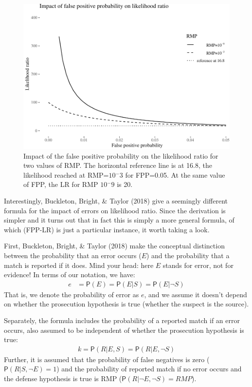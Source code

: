\documentclass[
  10pt,
  dvipsnames,enabledeprecatedfontcommands]{scrartcl}
\newcommand{\n}{\neg}
\newcommand{\pr}[1]{\mathsf{P}(#1)}
\begin{document}
\begin{figure}

\begin{center}\includegraphics[width=1\linewidth]{lr-chapter4_files/figure-latex/fig-fpplr-1} \end{center}
\label{fig:fpplr}
\caption{Impact of the false positive probability on the likelihood ratio for two values of RMP. The horizontal reference line is at 16.8, the likelihood reached at RMP=$10{^-3}$ for FPP=0.05. At the same value of FPP, the LR for RMP $10{^-9}$ is 20.}
\end{figure}

Interestingly, Buckleton, Bright, \& Taylor (2018) give a seemingly
different formula for the impact of errors on likelihood ratio. Since
the derivation is simpler and it turns out that in fact this is simply a
more general formula, of which (FPP-LR) is just a particular instance,
it worth taking a look.

First, Buckleton, Bright, \& Taylor (2018) make the conceptual
distinction between the probability that an error occurs (\(E\)) and the
probability that a match is reported if it does. Mind your head: here
\(E\) stands for error, not for evidence! In terms of our notation, we
have: \begin{align*}
e & = \pr{E} = \pr{E \vert S} = \pr{E \vert \n S}
\end{align*} \noindent That is, we denote the probability of error as
\(e\), and we assume it doesn't depend on whether the prosecution
hypothesis is true (whether the suspect is the source).

Separately, the formula includes the probability of a reported match if
an error occurs, also assumed to be independent of whether the
prosecution hypothesis is true: \begin{align*}
k =  \pr{R \vert E, S} = \pr{R \vert E, \n S}
\end{align*} \noindent Further, it is assumed that the probability of
false negatives is zero (\(\pr{R \vert S, \n E} =1\)) and the
probability of reported match if no error occurs and the defense
hypothesis is true is RMP (\(\pr{R \vert \n E, \n S}=RMP\)).
\end{document}

